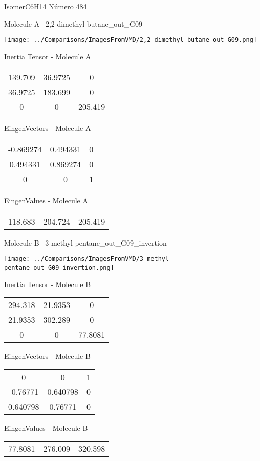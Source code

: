 \vtab[-3cm]
\begin{center}
{\large IsomerC6H14 \tab Número 484}
\end{center}
\begin{multicols}{2}
\begin{center}

Molecule A \
2,2-dimethyl-butane\_out\_G09

\texttt{[image: ../Comparisons/ImagesFromVMD/2,2-dimethyl-butane\_out\_G09.png]}

Inertia Tensor - Molecule A \\
\begin{tabular}{|c c c|}
139.709	 & 	36.9725	 & 	0	 \\
36.9725	 & 	183.699	 & 	0	 \\
0	 & 	0	 & 	205.419
\end{tabular}

\vtab
 EingenVectors - Molecule A     \\
\begin{tabular}{|c c c|}
-0.869274	 & 	0.494331	 & 	0	 \\
0.494331	 & 	0.869274	 & 	0	 \\
0	 & 	0	 & 	1
\end{tabular}

\vtab
 EingenValues - Molecule A     \\
\begin{tabular}{|c c c|}
118.683	 & 	204.724	 & 	205.419	 \\
\end{tabular}
\columnbreak

Molecule B \
3-methyl-pentane\_out\_G09\_invertion

\texttt{[image: ../Comparisons/ImagesFromVMD/3-methyl-pentane\_out\_G09\_invertion.png]}

Inertia Tensor - Molecule B \\
\begin{tabular}{|c c c|}
294.318	 & 	21.9353	 & 	0	 \\
21.9353	 & 	302.289	 & 	0	 \\
0	 & 	0	 & 	77.8081
\end{tabular}

\vtab
 EingenVectors - Molecule B     \\
\begin{tabular}{|c c c|}
0	 & 	0	 & 	1	 \\
-0.76771	 & 	0.640798	 & 	0	 \\
0.640798	 & 	0.76771	 & 	0
\end{tabular}

\vtab
 EingenValues - Molecule B     \\
\begin{tabular}{|c c c|}
77.8081	 & 	276.009	 & 	320.598	 \\
\end{tabular}

\end{center}
\end{multicols}

